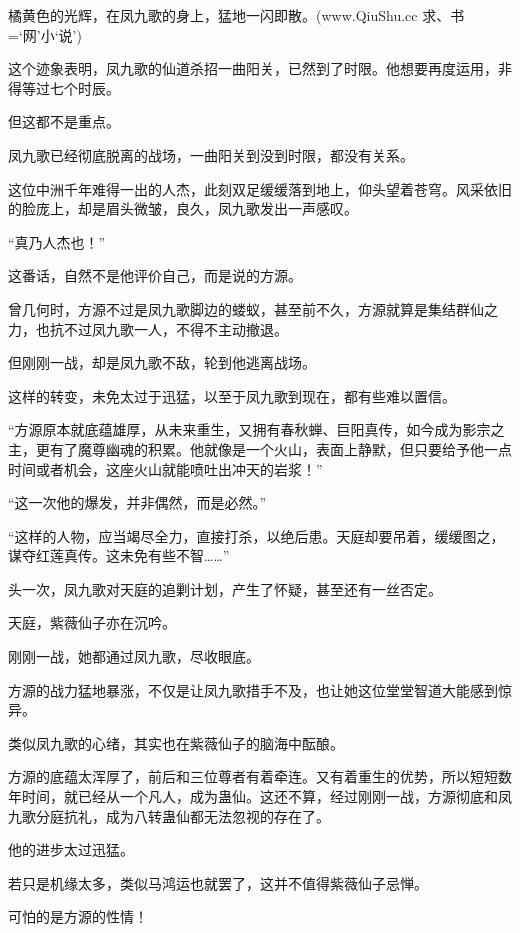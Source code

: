 
\begin{this_body}

橘黄色的光辉，在凤九歌的身上，猛地一闪即散。(www.QiuShu.cc 求、书=‘网’小‘说’)

这个迹象表明，凤九歌的仙道杀招一曲阳关，已然到了时限。他想要再度运用，非得等过七个时辰。

但这都不是重点。

凤九歌已经彻底脱离的战场，一曲阳关到没到时限，都没有关系。

这位中洲千年难得一出的人杰，此刻双足缓缓落到地上，仰头望着苍穹。风采依旧的脸庞上，却是眉头微皱，良久，凤九歌发出一声感叹。

“真乃人杰也！”

这番话，自然不是他评价自己，而是说的方源。

曾几何时，方源不过是凤九歌脚边的蝼蚁，甚至前不久，方源就算是集结群仙之力，也抗不过凤九歌一人，不得不主动撤退。

但刚刚一战，却是凤九歌不敌，轮到他逃离战场。

这样的转变，未免太过于迅猛，以至于凤九歌到现在，都有些难以置信。

“方源原本就底蕴雄厚，从未来重生，又拥有春秋蝉、巨阳真传，如今成为影宗之主，更有了魔尊幽魂的积累。他就像是一个火山，表面上静默，但只要给予他一点时间或者机会，这座火山就能喷吐出冲天的岩浆！”

“这一次他的爆发，并非偶然，而是必然。”

“这样的人物，应当竭尽全力，直接打杀，以绝后患。天庭却要吊着，缓缓图之，谋夺红莲真传。这未免有些不智……”

头一次，凤九歌对天庭的追剿计划，产生了怀疑，甚至还有一丝否定。

天庭，紫薇仙子亦在沉吟。

刚刚一战，她都通过凤九歌，尽收眼底。

方源的战力猛地暴涨，不仅是让凤九歌措手不及，也让她这位堂堂智道大能感到惊异。

类似凤九歌的心绪，其实也在紫薇仙子的脑海中酝酿。

方源的底蕴太浑厚了，前后和三位尊者有着牵连。又有着重生的优势，所以短短数年时间，就已经从一个凡人，成为蛊仙。这还不算，经过刚刚一战，方源彻底和凤九歌分庭抗礼，成为八转蛊仙都无法忽视的存在了。

他的进步太过迅猛。

若只是机缘太多，类似马鸿运也就罢了，这并不值得紫薇仙子忌惮。

可怕的是方源的性情！


\end{this_body}
